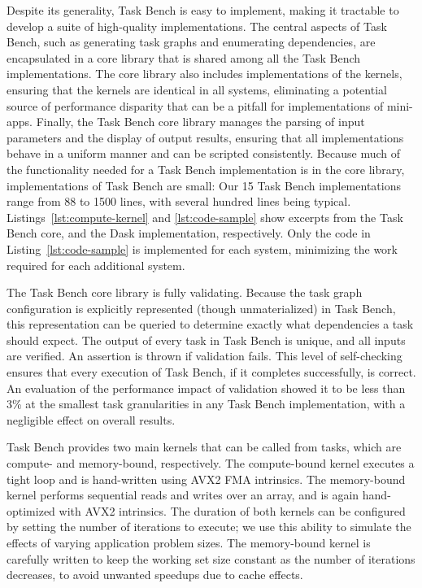 


Despite its generality, Task Bench is easy to implement, making it
tractable to develop a suite of high-quality implementations. The central aspects of Task Bench, such as generating
task graphs and enumerating dependencies, are encapsulated in a core
library that is shared among all the Task Bench implementations. The
core library also includes implementations of the kernels, ensuring
that the kernels are identical in all systems, eliminating a potential
source of performance disparity that can be a pitfall for
implementations of mini-apps. Finally, the Task Bench core library manages the
parsing of input parameters and the display of output results,
ensuring that all implementations behave in a uniform manner and can
be scripted consistently. Because much of the functionality needed for
a Task Bench implementation is in the core library, implementations of
Task Bench are small: Our 15 Task Bench implementations range from 88
to 1500 lines, with several hundred lines being
typical. Listings~\ref{lst:compute-kernel} and \ref{lst:code-sample}
show excerpts from the Task Bench core, and the Dask implementation,
respectively. Only the code in Listing~\ref{lst:code-sample} is
implemented for each system, minimizing the work required for each additional system.




The Task Bench core library is fully
validating. Because the task graph configuration is explicitly
represented (though unmaterialized) in Task Bench, this representation
can be queried to determine exactly what dependencies a task should
expect. The output of every task in Task Bench is unique,
and all inputs are verified. An assertion is thrown if validation
fails. This level of self-checking ensures that every execution of Task Bench, if it
completes successfully, is correct. An evaluation of the performance impact of
validation showed it to be less than 3\% at the smallest task
granularities in any Task Bench implementation, with a negligible
effect on overall results.

Task Bench provides two main kernels that can be called from tasks,
which are compute- and memory-bound, respectively. The compute-bound
kernel executes a tight loop and is hand-written using AVX2 FMA
intrinsics. The memory-bound kernel performs sequential reads and
writes over an array, and is again hand-optimized with AVX2
intrinsics. The duration of both kernels can be configured by setting
the number of iterations to execute; we use this ability to simulate
the effects of varying application problem sizes. The memory-bound
kernel is carefully written to keep the working set size constant as
the number of iterations decreases, to avoid unwanted speedups due to
cache effects.
